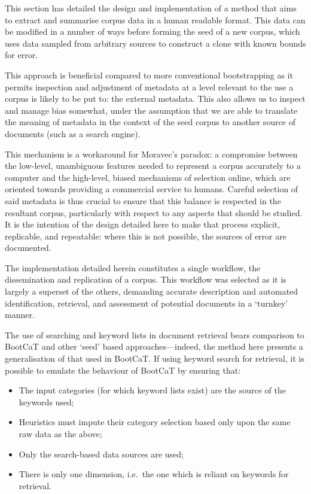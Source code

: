 

This section has detailed the design and implementation of a method that aims to extract and summarise corpus data in a human readable format.  This data can be modified in a number of ways before forming the seed of a new corpus, which uses data sampled from arbitrary sources to construct a clone with known bounds for error.

This approach is beneficial compared to more conventional bootstrapping as it permits inspection and adjustment of metadata at a level relevant to the use a corpus is likely to be put to: the external metadata.  This also allows us to inspect and manage bias somewhat, under the assumption that we are able to translate the meaning of metadata in the context of the seed corpus to another source of documents (such as a search engine).

This mechanism is a workaround for Moravec's paradox\cite{moravec1988mind}: a compromise between the low-level, unambiguous features needed to represent a corpus accurately to a computer and the high-level, biased mechanisms of selection online, which are oriented towards providing a commercial service to humans.  Careful selection of said metadata is thus crucial to ensure that this balance is respected in the resultant corpus, particularly with respect to any aspects that should be studied.  It is the intention of the design detailed here to make that process explicit, replicable, and repeatable: where this is not possible, the sources of error are documented.

The implementation detailed herein constitutes a single workflow, the dissemination and replication of a corpus.  This workflow was selected as it is largely a superset of the others, demanding accurate description and automated identification, retrieval, and assessment of potential documents in a `turnkey' manner.




The use of searching and keyword lists in document retrieval bears comparison to BootCaT and other `seed' based approaches---indeed, the method here presents a generalisation of that used in BootCaT.  If using keyword search for retrieval, it is possible to emulate the behaviour of BootCaT by ensuring that:

\begin{itemize}
    \item The input categories (for which keyword lists exist) are the source of the keywords used;
    \item Heuristics must impute their category selection based only upon the same raw data as the above;
    \item Only the search-based data sources are used;
    \item There is only one dimension, i.e.\ the one which is reliant on keywords for retrieval.
\end{itemize}

